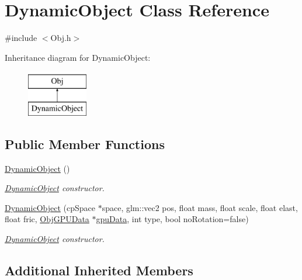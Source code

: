\hypertarget{class_dynamic_object}{}\section{Dynamic\+Object Class Reference}
\label{class_dynamic_object}


{\ttfamily \#include $<$Obj.\+h$>$}

Inheritance diagram for Dynamic\+Object\+:\begin{figure}[H]
\begin{center}
\leavevmode
\includegraphics[height=2.000000cm]{class_dynamic_object}
\end{center}
\end{figure}
\subsection*{Public Member Functions}
\begin{DoxyCompactItemize}
\item 
\hyperlink{class_dynamic_object_a50a7adf3d7d1f411ed2aa9a663bfe275}{Dynamic\+Object} ()\hypertarget{class_dynamic_object_a50a7adf3d7d1f411ed2aa9a663bfe275}{}\label{class_dynamic_object_a50a7adf3d7d1f411ed2aa9a663bfe275}

\begin{DoxyCompactList}\small\item\em \hyperlink{class_dynamic_object}{Dynamic\+Object} constructor. \end{DoxyCompactList}\item 
\hyperlink{class_dynamic_object_a09f1992e754cb6f076923abefcb10a01}{Dynamic\+Object} (cp\+Space $\ast$space, glm\+::vec2 pos, float mass, float scale, float elast, float fric, \hyperlink{class_obj_g_p_u_data}{Obj\+G\+P\+U\+Data} $\ast$\hyperlink{class_obj_a33a9a5371319a410f7d2d395a7ef2423}{gpu\+Data}, int type, bool no\+Rotation=false)
\begin{DoxyCompactList}\small\item\em \hyperlink{class_dynamic_object}{Dynamic\+Object} constructor. \end{DoxyCompactList}\end{DoxyCompactItemize}
\subsection*{Additional Inherited Members}


